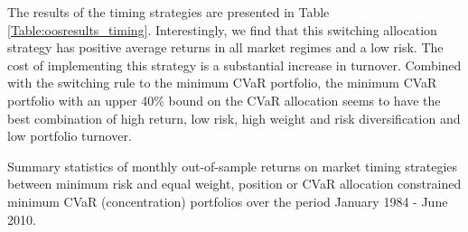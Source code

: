 \documentclass[12pt,a4paper]{article}
\begin{document}
The results of the timing strategies are presented in Table \ref{Table:oosresults_timing}. Interestingly, we find  that this switching allocation strategy has positive average returns in all market regimes and a low risk. The cost of implementing this strategy is a substantial increase in turnover. Combined with the switching rule to the minimum CVaR portfolio, the minimum CVaR portfolio with an upper 40\% bound on the CVaR allocation seems to have the best combination of high return, low risk, high weight and risk diversification and low portfolio turnover.




\begin{table}[tb]
\begin{center}

\caption{Summary statistics of monthly out-of-sample returns on market timing strategies between
minimum risk and equal weight, position or CVaR allocation constrained minimum CVaR (concentration) portfolios over the period January 1984 - June 2010. \label{Table:oosresults_timing}    } \vspace{-0.5cm}


\end{center}
\end{table}
\end{document}
